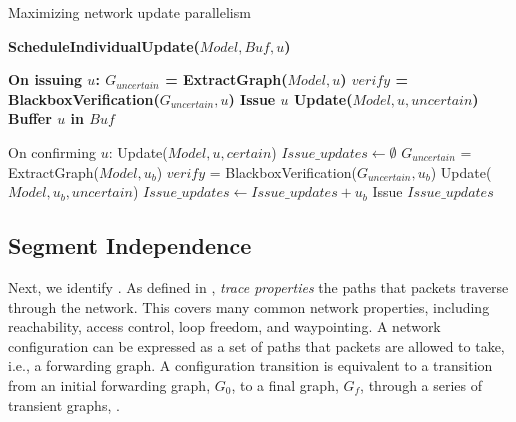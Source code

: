 \begin{algorithm}[t]
  \small
\caption{Maximizing network update parallelism}
\bf{ScheduleIndividualUpdate}($Model, Buf, u$)
\begin{algorithmic} 
\State \bf{On issuing $u$:}
\State $G_{uncertain}$ = ExtractGraph($Model, u$)
\State $verify$ = BlackboxVerification($G_{uncertain}, u$)
        \State Issue $u$
        \State Update($Model, u, uncertain$)
\Else
        \State Buffer $u$ in $Buf$
\EndIf

\State
\State On confirming $u$:
\State Update($Model, u, certain$)
\State $Issue\_updates \gets \emptyset$
                \State $G_{uncertain}$ = ExtractGraph($Model, u_b$)
                \State $verify$ = BlackboxVerification($G_{uncertain}, u_b$)
                        \State {}
                        \State Update($Model, u_b, uncertain$)
                        \State $Issue\_updates \gets Issue\_updates + u_b$
                \EndIf
\EndFor
\State Issue $Issue\_updates$
\label{alg:blackbox}
\end{algorithmic}  
\end{algorithm}

\subsection{Segment Independence}
\label{sec:seg-independence}

Next, we identify .
As defined in \cite{Reitblatt2012}, {\em trace properties} 
the paths that packets traverse through the network.  This covers many common network properties, including reachability, access control, loop freedom, and waypointing.
A network configuration can be expressed as a set of paths that packets are allowed to take,
i.e., a forwarding graph.
A configuration transition is equivalent to a transition from an initial forwarding graph, $G_0$,
to a final graph, $G_f$, through a series of transient graphs, .  


